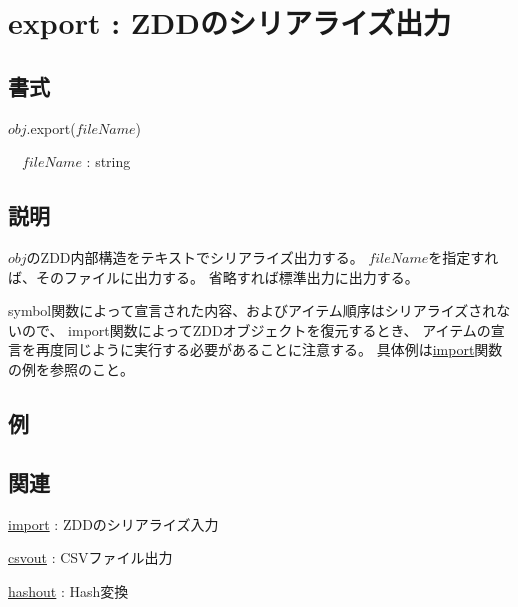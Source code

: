 
\section{export : ZDDのシリアライズ出力\label{sect:export}}
\subsection*{書式}
$obj$.export($fileName$)

~~$fileName$ : string

\subsection*{説明}
$obj$のZDD内部構造をテキストでシリアライズ出力する。
$fileName$を指定すれば、そのファイルに出力する。
省略すれば標準出力に出力する。

symbol関数によって宣言された内容、およびアイテム順序はシリアライズされないので、
import関数によってZDDオブジェクトを復元するとき、
アイテムの宣言を再度同じように実行する必要があることに注意する。
具体例は\hyperref[sect:import]{import}関数の例を参照のこと。

\subsection*{例}


\subsection*{関連}
\hyperref[sect:import]{import} : ZDDのシリアライズ入力

\hyperref[sect:csvout]{csvout} : CSVファイル出力

\hyperref[sect:hashout]{hashout} : Hash変換
